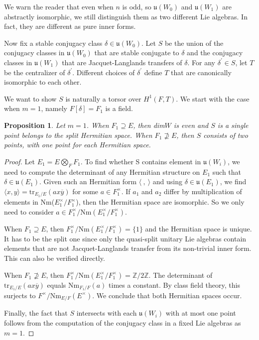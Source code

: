 \documentclass[11pt, oneside,reqno]{amsart}   	%
\newtheorem{proposition}[theorem]{Proposition}
\begin{document}
We warn the reader that even when $n$ is odd, so $\mathfrak{u}(W_0)$ and $\mathfrak{u}(W_1)$ are abstractly isomorphic, we still distinguish them as two different Lie algebras. In fact, they are different as pure inner forms.

Now fix a stable conjugacy class $\delta \in \mathfrak{u}(W_0)$.  Let $S$ be the union of the conjugacy classes in $\mathfrak{u}(W_0)$ that are stable conjugate to $\delta$ and the conjugacy classes in $\mathfrak{u}(W_1)$ that are Jacquet-Langlands transfers of $\delta$. For any $\delta^' \in S$, let $T$ be the centralizer of $\delta^'$.  Different choices of $\delta^'$ define $T$ that are canonically isomorphic to each other.

We want to show $S$ is naturally a torsor over $H^1(F,T)$. We start with the case when $m=1$, namely $F[\delta]=F_1$ is a field.

\begin{proposition}
Let $m=1$. When $F_1 \supseteq E$, then \textup{dim}$W$ is even and $S$ is a single point belongs to the split Hermitian space. When $F_1 \nsupseteq E$, then $S$ consists of two points, with one point for each Hermitian space.
\end{proposition}

\begin{proof}
Let $E_1=E \bigotimes_F F_1$.
To find whether S contains element in $\mathfrak{u}(W_i)$, we need to compute the determinant of any Hermitian structure on $E_1$ such that $\delta \in \mathfrak{u}(E_1)$. Given such an Hermitian form $\langle \ , \ \rangle$ and using $\delta \in \mathfrak{u}(E_1)$, we find $\langle x , y \rangle=\text{tr}_{E_1/E}(ax\overline{y})$ for some $a \in F_1^\times$. If $a_1$ and $a_2$ differ by multiplication of elements in Nm($E_1^\times/F_1^\times$), then the Hermitian space are isomorphic. So we only need to consider $a \in F_1^\times/\text{Nm}(E_1^\times/F_1^\times)$.

When $F_1 \supseteq E$, then $F_1^\times/\text{Nm}(E_1^\times/F_1^\times)=\{1\}$ and the Hermitian space is unique. It has to be the split one since only the quasi-split unitary Lie algebras contain elements that are not Jacquet-Langlands transfer from its non-trivial inner form. This can also be verified directly.

When $F_1 \nsupseteq E$, then $F_1^\times/\text{Nm}(E_1^\times/F_1^\times)=\mathbb{Z}/2\mathbb{Z}$. The determinant of $\text{tr}_{E_1/E}(ax\overline{y})$ equals Nm$_{F_1/F}(a)$ times a constant. By class field theory, this surjects to $F^\times/\text{Nm}_{E/F}(E^\times)$. We conclude that both Hermitian spaces occur.

Finally, the fact that $S$ intersects with each $\mathfrak{u}(W_i)$ with at most one point follows from the computation of the conjugacy class in a fixed Lie algebras as $m=1$.

\end{proof}
\end{document}
